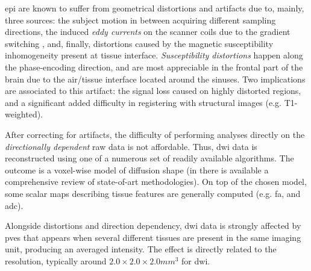 \Gls{epi} are known to suffer from geometrical distortions and artifacts
due to, mainly, three sources: the subject motion in between acquiring 
different sampling directions, the induced \emph{eddy currents} on the scanner 
coils due to the gradient switching \citep{obrien_3d_2013}, and, finally, 
distortions caused by the magnetic susceptibility inhomogeneity
present at tissue interface. \emph{Susceptibility distortions} happen along the 
phase-encoding direction, and are most appreciable in the frontal part of 
the brain due to the air/tissue interface located around the sinuses.
Two implications are associated to this artifact: the signal loss caused on
highly distorted regions, and a significant added difficulty in 
registering with structural images (e.g. T1-weighted).

After correcting for artifacts, the difficulty of performing analyses directly
on the \emph{directionally dependent} raw data is not affordable. Thus, 
\gls{dwi} data is reconstructed using one of a numerous set of readily 
available algorithms. The outcome is a voxel-wise model of diffusion shape 
(in \citep{daducci_isbi2013_2013}  there is available a comprehensive review of 
state-of-art methodologies). On top of the
chosen model, some scalar maps describing tissue features are generally
computed (e.g. \gls*{fa}, and \gls*{adc}).

Alongside distortions and direction dependency, \gls{dwi} data is strongly 
affected by \glspl{pve} \citep{alexander_analysis_2001} that appears when
several different tissues are present in the same imaging unit, producing
an averaged intensity. The effect is directly related to the resolution,
typically around $2.0\times2.0\times2.0mm^3$ for \gls{dwi}.


